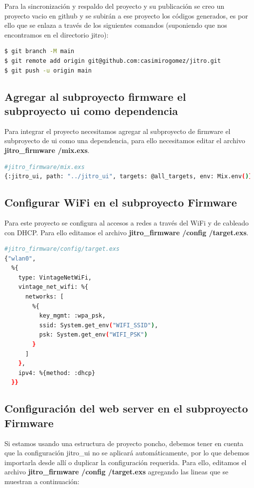 Para la sincronización y respaldo del proyecto y su publicación se creo un proyecto vacio en github y se subirán a ese proyecto los códigos generados, es por ello que se enlaza a través de los siguientes comandos (suponiendo que nos encontramos en el directorio jitro):

\begin{lstlisting}[language=bash]
$ git branch -M main
$ git remote add origin git@github.com:casimirogomez/jitro.git
$ git push -u origin main
\end{lstlisting}

\subsection{Agregar al subproyecto firmware el subproyecto ui como dependencia}

Para integrar el proyecto necesitamos agregar al subproyecto de firmware el subproyecto de ui como una dependencia, para ello necesitamos editar el archivo \textbf{jitro\_firmware /mix.exs}.

\begin{lstlisting}[language=bash]
#jitro_firmware/mix.exs
{:jitro_ui, path: "../jitro_ui", targets: @all_targets, env: Mix.env()},
\end{lstlisting}

\subsection{Configurar WiFi en el subproyecto Firmware}

Para este proyecto se configura al accesos a redes a través del WiFi y de cableado con DHCP. Para ello editamos el archivo \textbf{jitro\_firmware /config /target.exs}.

\begin{lstlisting}[language=bash]
#jitro_firmware/config/target.exs
{"wlan0",
  %{
    type: VintageNetWiFi,
    vintage_net_wifi: %{
      networks: [
        %{
          key_mgmt: :wpa_psk,
          ssid: System.get_env("WIFI_SSID"),
          psk: System.get_env("WIFI_PSK")
        }
      ]
    },
    ipv4: %{method: :dhcp}
  }}
\end{lstlisting}


\subsection{Configuración del web server en el subproyecto Firmware}

Si estamos usando una estructura de proyecto poncho, debemos tener en cuenta que la configuración jitro\_ui no se aplicará automáticamente, por lo que debemos importarla desde allí o duplicar la configuración requerida. Para ello, editamos el archivo \textbf{jitro\_firmware /config /target.exs} agregando las lineas que se muestran a continuación:

